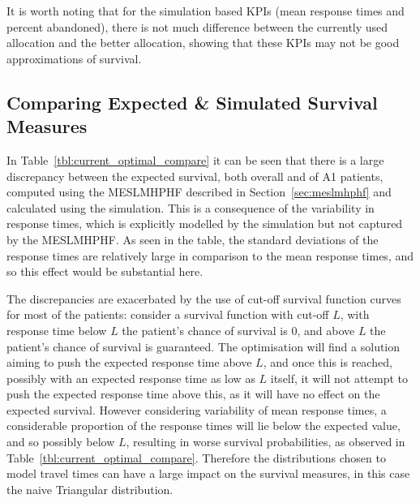 \documentclass[numbers,webpdf,imaman]{ima-authoring-template}%
\begin{document}
It is worth noting that for the simulation based KPIs (mean response times and
percent abandoned), there is not much
difference between the currently used allocation and the better allocation,
showing that these KPIs may not be good approximations of survival.

\begin{table}
\resizebox{\textwidth}{!}{%
%
}
\caption{Calculated KPIs for the current and improved allocations under the
four possible demand scenarios.}
\label{tbl:current_optimal_compare}
\end{table}

\subsection{Comparing Expected \& Simulated Survival Measures}\label{sec:compare_exp_and_sim}
In Table~\ref{tbl:current_optimal_compare} it can be seen that there is a large
discrepancy between the expected survival, both overall and of A1 patients,
computed using the MESLMHPHF described in Section~\ref{sec:meslmhphf} and
calculated using the simulation. This is a consequence of the variability in
response times, which is explicitly modelled by the simulation but not captured
by the MESLMHPHF. As seen in the table, the standard deviations of the response
times are relatively large in comparison to the mean response times, and so this
effect would be substantial here.

The discrepancies are exacerbated by the use of cut-off survival function curves
for most of the patients: consider a survival function with cut-off $L$, with
response time below $L$ the patient's chance of survival is 0, and above $L$ the
patient's chance of survival is guaranteed. The optimisation will find a
solution aiming to push the expected response time above $L$, and once this is
reached, possibly with an expected response time as low as $L$ itself, it will
not attempt to push the expected
response time above this, as it will have no effect on the expected survival.
However considering variability of mean response times, a considerable
proportion of the response times will lie below the expected value, and so
possibly below $L$, resulting in worse survival probabilities, as observed in
Table~\ref{tbl:current_optimal_compare}. Therefore the distributions chosen to
model travel times can have a large impact on the survival measures, in this
case the naive Triangular distribution.
\end{document}
